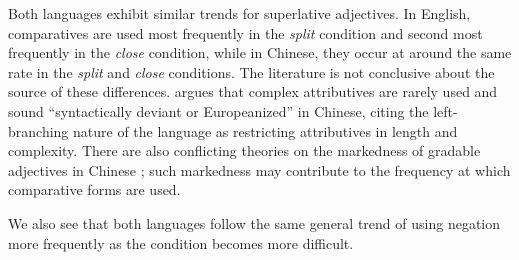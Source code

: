 \documentclass[11pt,a4paper]{article}
\renewcommand{\|}{\mid}
\begin{document}
Both languages exhibit similar trends for superlative adjectives. In English, comparatives are used most frequently in the \emph{split} condition and second most frequently in the \emph{close} condition, while in Chinese, they occur at around the same rate in the \emph{split} and \emph{close} conditions. The literature is not conclusive about the source of these differences. \citet{Xia:2014} argues that complex attributives are rarely used and sound ``syntactically deviant or Europeanized'' \citep{Zhu:1982,Xie:2001} in Chinese, citing the left-branching nature of the language as restricting attributives in length and complexity. There are also conflicting theories on the markedness of gradable adjectives in Chinese \citep{Grano:2012,Ito:2008}; such markedness may contribute to the frequency at which comparative forms are used.

We also see that both languages follow the same general trend of using negation more frequently as the condition becomes more difficult.
\end{document}
